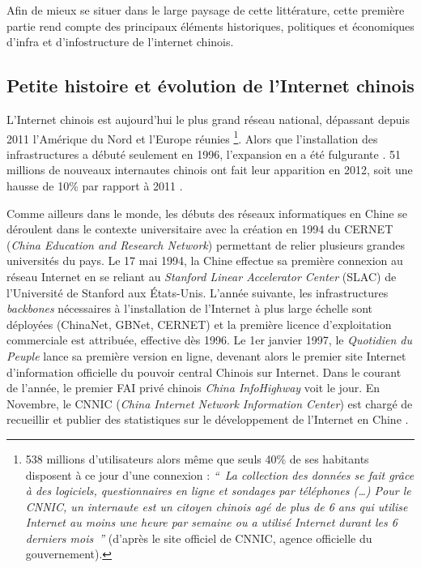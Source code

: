 Afin de mieux se situer dans le large paysage de cette littérature, cette première partie rend compte des principaux éléments historiques, politiques et économiques d’infra et d’infostructure de l’internet chinois.

\subsection[Petite histoire et évolution de l’Internet chinois]{Petite histoire et évolution de l’Internet chinois}

L’Internet chinois est aujourd’hui le plus grand réseau national, dépassant depuis 2011 l’Amérique du Nord et l’Europe réunies \citep{CNNIC2013}\footnote{538 millions d'utilisateurs alors même que seuls 40\% de ses habitants disposent à ce jour d’une connexion : \textit{`` La collection des données se fait grâce à des logiciels, questionnaires en ligne et sondages par téléphones (…) Pour le CNNIC, un internaute est un citoyen chinois agé de plus de 6 ans qui utilise Internet au moins une heure par semaine ou a utilisé Internet durant les 6 derniers mois ''} (d’après le site officiel de CNNIC, agence officielle du gouvernement).}. Alors que l’installation des infrastructures a débuté seulement en 1996, l’expansion en a été fulgurante \citep{Fang2006}. 51 millions de nouveaux internautes chinois ont fait leur apparition en 2012, soit une hausse de 10\% par rapport à 2011 \citep{CNNIC2013}. 

Comme ailleurs dans le monde, les débuts des réseaux informatiques en Chine se déroulent dans le contexte universitaire avec la création en 1994 du CERNET (\textit{China Education and Research Network}) permettant de relier plusieurs grandes universités du pays. Le 17 mai 1994, la Chine effectue sa première connexion au réseau Internet en se reliant au \textit{Stanford Linear Accelerator Center} (SLAC) de l’Université de Stanford aux États-Unis. L’année suivante, les infrastructures \textit{backbones} nécessaires à l’installation de l’Internet à plus large échelle sont déployées (ChinaNet, GBNet, CERNET) et la première licence d’exploitation commerciale est attribuée, effective dès 1996. Le 1er janvier 1997, le \textit{Quotidien du Peuple} lance sa première version en ligne, devenant alors le premier site Internet d’information officielle du pouvoir central Chinois sur Internet. Dans le courant de l’année, le premier FAI privé chinois \textit{China InfoHighway} voit le jour. En Novembre, le CNNIC (\textit{China Internet Network Information Center}) est chargé de recueillir et publier des statistiques sur le développement de l’Internet en Chine \citep{Dai2007}.

